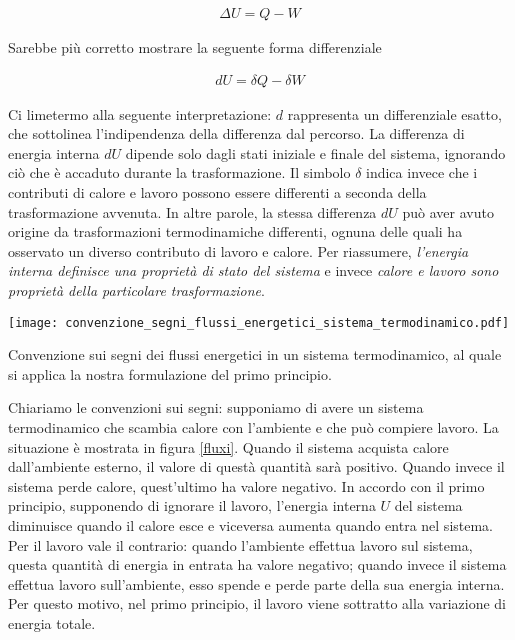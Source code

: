 \begin{align}
    \Delta U = Q - W\label{firstprincip}
\end{align}

\noindent Sarebbe più corretto mostrare la seguente forma differenziale

\begin{tcolorbox}[colback = red!30, colframe = red!30!black, title = {Primo principio della termodinamica}]
\begin{align}
    dU = \delta Q - \delta W
\end{align}
\end{tcolorbox}

\noindent Ci limetermo alla seguente interpretazione: $d$ rappresenta
un differenziale esatto, che sottolinea l'indipendenza della differenza
dal percorso. La differenza di energia interna $dU$ dipende solo dagli
stati iniziale e finale del sistema, ignorando ciò che è accaduto durante la
trasformazione.
Il simbolo $\delta$ indica invece che i contributi di calore e lavoro
possono essere differenti a seconda della trasformazione
avvenuta. In altre parole, la stessa differenza $dU$ può aver
avuto origine da trasformazioni termodinamiche differenti, ognuna
delle quali ha osservato un diverso contributo di lavoro e calore.
Per riassumere, \textit{l'energia interna definisce una proprietà
di stato del sistema} e invece \textit{calore e lavoro sono proprietà
della particolare trasformazione}.

\begin{marginfigure}
    \centering
    \texttt{[image: convenzione\_segni\_flussi\_energetici\_sistema\_termodinamico.pdf]}
    \caption{Convenzione sui segni dei flussi energetici in un
    sistema termodinamico, al quale si applica la nostra
    formulazione del primo principio.}\label{fluxi}
\end{marginfigure}

Chiariamo le convenzioni sui segni: supponiamo di avere un sistema
termodinamico che scambia calore con l'ambiente e che può compiere
lavoro. La situazione è mostrata in figura \ref{fluxi}.
Quando il sistema acquista calore dall'ambiente esterno,
il valore di questà quantità sarà positivo. Quando invece il
sistema perde calore, quest'ultimo ha valore negativo. In accordo
con il primo principio, supponendo di ignorare il lavoro, l'energia
interna $U$ del sistema diminuisce quando il calore esce e viceversa
aumenta quando entra nel sistema.
Per il lavoro vale il contrario: quando l'ambiente effettua lavoro
sul sistema, questa quantità di energia in entrata ha valore negativo;
quando invece il sistema effettua lavoro sull'ambiente, esso spende
e perde parte della sua energia interna. Per questo motivo, nel
primo principio, il lavoro viene sottratto alla variazione di energia
totale.

